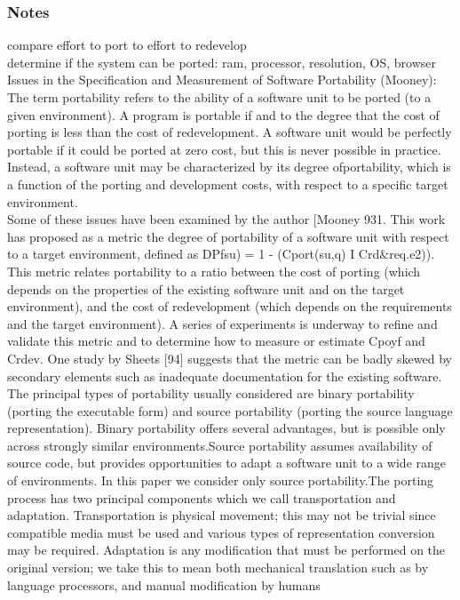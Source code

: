 \documentclass{article}
\begin{document}
\subsubsection{Notes}
compare effort to port to effort to redevelop\\ 

determine if the system can be ported: ram, processor, resolution, OS, browser\\ 

\noindent Issues in the Specification and Measurement of Software Portability (Mooney):\\
The term portability
 refers to the ability of a software
 unit to be ported (to a given environment).
 A program is
 portable if and to the degree that the cost of porting is less than
 the cost of redevelopment. A software unit would be perfectly
 portable if it could be ported at zero cost, but this is never
 possible in practice.
 Instead, a software unit may be
 characterized by its degree ofportability,
 which is a function of
 the porting and development costs, with respect to a specific
 target environment.\\   
 
 Some of these issues have been examined by the author
 [Mooney 931. This work has proposed as a metric the degree of
 portability
 of a software unit with respect to a target
 environment, defined as
 DPfsu) = 1 - (Cport(su,q) I Crd$\&$req.e2)).\\
 This metric relates portability to a ratio between the cost
 of porting (which depends on the properties of the existing
 software unit and on the target environment), and the cost of
 redevelopment (which depends on the requirements and the
 target environment). A series of experiments is underway to
 refine and validate this metric and to determine how to measure
 or estimate Cpoyf and Crdev.
 One study by Sheets [94]
 suggests that the metric can be badly skewed by secondary
 elements such as inadequate documentation for the existing
 software.\\
  
  The principal types of portability usually considered are binary portability (porting the executable form) and source portability (porting the source language representation). Binary portability offers several advantages, but is possible only across strongly similar environments.Source portability assumes availability of source code, but provides opportunities to adapt a software unit to a wide range of environments.  In this paper we consider only source portability.The porting process has two principal components which we call transportation and adaptation.  Transportation is physical movement;  this may not be trivial since compatible media must be used and various types of representation conversion may be required.  Adaptation is any modification that must be performed on the original version;  we take this to mean both mechanical translation such as by language processors, and manual modification by humans\\ 
\end{document}
